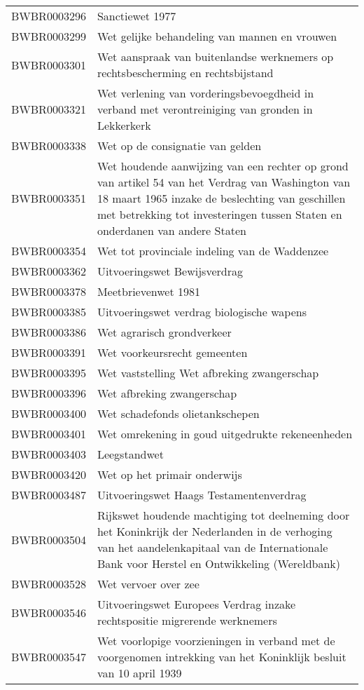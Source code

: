 \begin{longtable}{lp{}}
BWBR0003296 & Sanctiewet 1977 \\
BWBR0003299 & Wet gelijke behandeling van mannen en vrouwen \\
BWBR0003301 & Wet aanspraak van buitenlandse werknemers op rechtsbescherming en rechtsbijstand \\
BWBR0003321 & Wet verlening van vorderingsbevoegdheid in verband met verontreiniging van gronden in Lekkerkerk \\
BWBR0003338 & Wet op de consignatie van gelden \\
BWBR0003351 & Wet houdende aanwijzing van een rechter op grond van artikel 54 van het Verdrag van Washington van 18 maart 1965 inzake de beslechting van geschillen met betrekking tot investeringen tussen Staten en onderdanen van andere Staten \\
BWBR0003354 & Wet tot provinciale indeling van de Waddenzee \\
BWBR0003362 & Uitvoeringswet Bewijsverdrag \\
BWBR0003378 & Meetbrievenwet 1981 \\
BWBR0003385 & Uitvoeringswet verdrag biologische wapens \\
BWBR0003386 & Wet agrarisch grondverkeer \\
BWBR0003391 & Wet voorkeursrecht gemeenten \\
BWBR0003395 & Wet vaststelling Wet afbreking zwangerschap \\
BWBR0003396 & Wet afbreking zwangerschap \\
BWBR0003400 & Wet schadefonds olietankschepen  \\
BWBR0003401 & Wet omrekening in goud uitgedrukte rekeneenheden \\
BWBR0003403 & Leegstandwet  \\
BWBR0003420 & Wet op het primair onderwijs \\
BWBR0003487 & Uitvoeringswet Haags Testamentenverdrag \\
BWBR0003504 & Rijkswet houdende machtiging tot deelneming door het Koninkrijk der Nederlanden in de verhoging van het aandelenkapitaal van de Internationale Bank voor Herstel en Ontwikkeling (Wereldbank) \\
BWBR0003528 & Wet vervoer over zee \\
BWBR0003546 & Uitvoeringswet Europees Verdrag inzake rechtspositie migrerende werknemers \\
BWBR0003547 & Wet voorlopige voorzieningen in verband met de voorgenomen intrekking van het Koninklijk besluit van 10 april 1939 \\

\end{longtable}
